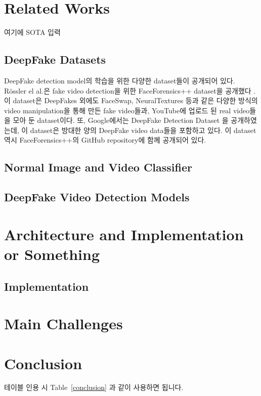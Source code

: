 \documentclass{article}
\begin{document}
	\section{Related Works}
	
	여기에 SOTA 입력
	
		\subsection{DeepFake Datasets}
		DeepFake detection model의 학습을 위한 다양한 dataset들이 공개되어 있다. R\"ossler el al.은 fake video detection을 위한 FaceForensics++ dataset을 공개했다 \cite{roessler2019faceforensicspp}. 이 dataset은 DeepFakes 외에도 FaceSwap, NeuralTextures 등과 같은 다양한 방식의 video manipulation을 통해 만든 fake video들과, YouTube에 업로드 된 real video들을 모아 둔 dataset이다. 또, Google에서는 DeepFake Detection Dataset \cite{DDD_GoogleJigSaw2019} 을 공개하였는데, 이 dataset은 방대한 양의 DeepFake video data들을 포함하고 있다. 이 dataset 역시 FaceForensics++의 GitHub 
		repository에 함께 공개되어 있다.
		
		\subsection{Normal Image and Video Classifier}
		
		\subsection{DeepFake Video Detection Models}
	
	\section{Architecture and Implementation or Something}
	
	\subsection{Implementation}
	
	
	
	\section{Main Challenges}
	
	
	\section{Conclusion}
	테이블 인용 시 Table~\ref{conclusion} 과 같이 사용하면 됩니다.
	
\end{document}
